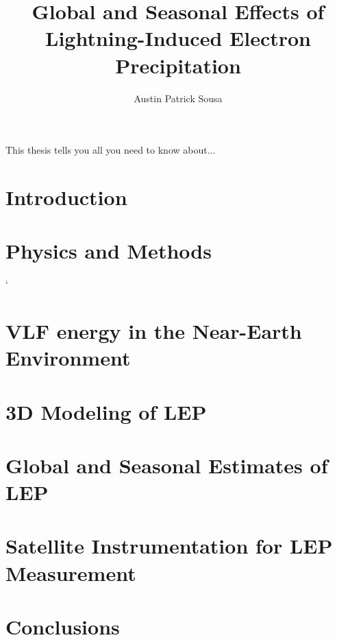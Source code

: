 \documentclass[12pt]{report}
\begin{document}
    \title{Global and Seasonal Effects of\\
            Lightning-Induced Electron Precipitation}
    \author{Austin Patrick Sousa}
    \beforepreface
        This thesis tells you all you need to know about...
        
    \afterpreface
 
    \chapter{Introduction}
    	

    \chapter{Physics and Methods}`
    	


    \chapter{VLF energy in the Near-Earth Environment}
    	

    \chapter{3D Modeling of LEP}
    	

    \chapter{Global and Seasonal Estimates of LEP}
    	

    \chapter{Satellite Instrumentation for LEP Measurement}
    	

    \chapter{Conclusions}
    	


    
    
    
\end{document}
